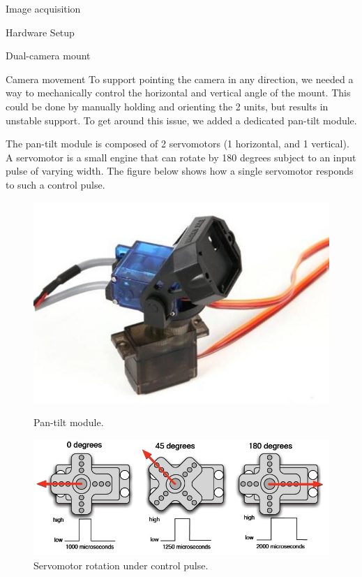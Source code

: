 \documentclass[10pt]{article}
\begin{document}
\begin{section}{Image acquisition}
\begin{subsection}{Hardware Setup}
\begin{subsubsection}{Dual-camera mount}
        \end{subsubsection}
    \end{subsection} %

    \begin{subsubsection}{Camera movement}
        To support pointing the camera in any direction, we needed a way to mechanically control the horizontal and vertical angle of the mount. This could be done by manually holding and orienting the 2 units, but results in unstable support. To get around this issue, we added a dedicated pan-tilt module.

        \medskip

        The pan-tilt module is composed of 2 servomotors (1 horizontal, and 1 vertical). A servomotor is a small engine that can rotate by 180 degrees subject to an input pulse of varying width. The figure below shows how a single servomotor responds to such a control pulse.

        \begin{figure}[!h]
            \centering
            \begin{minipage}[b]{0.3\textwidth}
                \includegraphics[width=\textwidth]{fig/pantilt_without_mount.jpg}
                \caption{Pan-tilt module.}
            \end{minipage}%
            \begin{minipage}[b]{0.5\textwidth}
                \includegraphics[width=\textwidth]{fig/servomotor_internals.jpg}
                \caption{Servomotor rotation under control pulse. \cite{servo}}
            \end{minipage}
        \end{figure}


\end{subsubsection}
\end{section}
\end{document}
